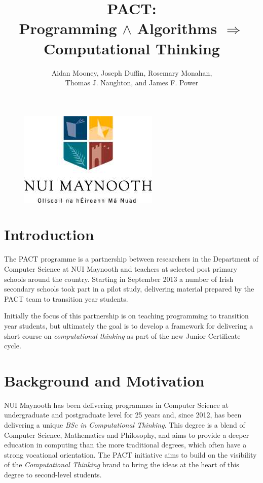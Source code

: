 \documentclass[a4paper]{article}
\begin{document}
\title{PACT: \\ {\large Programming ${\land}$ Algorithms $\Rightarrow$ Computational Thinking}}

\author{Aidan Mooney, Joseph Duffin, Rosemary Monahan, \\ Thomas J. Naughton, and James F. Power}

\begin{figure}\centering
\includegraphics[height=.2\textheight]{nuim_large.jpg}
\end{figure}

\maketitle

\section{Introduction}
The PACT programme is a partnership between researchers in the Department of Computer Science at NUI Maynooth and teachers at selected post primary schools around the country.   Starting in September 2013 a number of Irish secondary schools took part in a pilot study, delivering material prepared by the PACT team to transition year students.

Initially the focus of this partnership is on teaching programming to transition year students, but ultimately the goal is to develop a framework for delivering a short course on \textit{computational thinking} as part of the new Junior Certificate cycle.


\section{Background and Motivation} \label{Background}

NUI Maynooth has been delivering programmes in Computer Science at undergraduate and postgraduate level for 25 years and, since 2012, has been delivering a unique \textit{BSc in Computational Thinking}.  This degree is a blend of Computer Science, Mathematics and Philosophy, and aims to provide a deeper education in computing than the more traditional degrees, which often have a strong vocational orientation.  The PACT initiative aims to build on the visibility of the \textit{Computational Thinking} brand to bring the ideas at the heart of this degree to second-level students.
\end{document}
